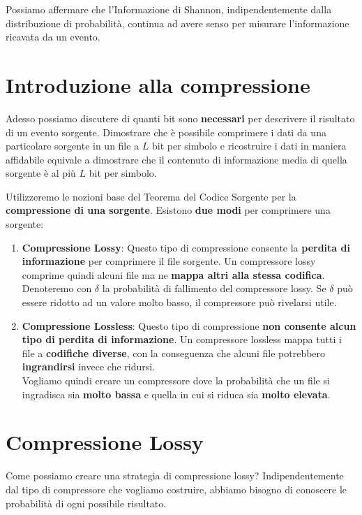 Possiamo affermare che l'Informazione di Shannon, indipendentemente dalla distribuzione di probabilità, continua ad avere senso per misurare l'informazione ricavata da un evento.

\newpage
\section{Introduzione alla compressione}
Adesso possiamo discutere di quanti bit sono \textbf{necessari} per descrivere il risultato di un evento sorgente.
Dimostrare che è possibile comprimere i dati da una particolare sorgente in un file a $L$ bit per simbolo e ricostruire i dati in maniera affidabile equivale a dimostrare che il contenuto di informazione media di quella sorgente è al più $L$ bit per simbolo.

Utilizzeremo le nozioni base del Teorema del Codice Sorgente per la \textbf{compressione di una sorgente}. Esistono \textbf{due modi} per comprimere una sorgente:
\begin{enumerate}
	\item \textbf{Compressione Lossy}: Questo tipo di compressione consente la \textbf{perdita di informazione} per comprimere il file sorgente. Un compressore lossy comprime quindi alcuni file ma ne \textbf{mappa altri alla stessa codifica}.\\ Denoteremo con $\delta$ la probabilità di fallimento del compressore lossy. Se $\delta$ può essere ridotto ad un valore molto basso, il compressore può rivelarsi utile.
	
	\item \textbf{Compressione Lossless}: Questo tipo di compressione \textbf{non consente alcun tipo di perdita di informazione}. Un compressore lossless mappa tutti i file a \textbf{codifiche diverse}, con la conseguenza che alcuni file potrebbero \textbf{ingrandirsi} invece che ridursi.\\
	Vogliamo quindi creare un compressore dove la probabilità che un file si ingradisca sia \textbf{molto bassa} e quella in cui si riduca sia \textbf{molto elevata}.
\end{enumerate}

\section{Compressione Lossy}
Come possiamo creare una strategia di compressione lossy?
Indipendentemente dal tipo di compressore che vogliamo costruire, abbiamo bisogno di conoscere le probabilità di ogni possibile risultato.

